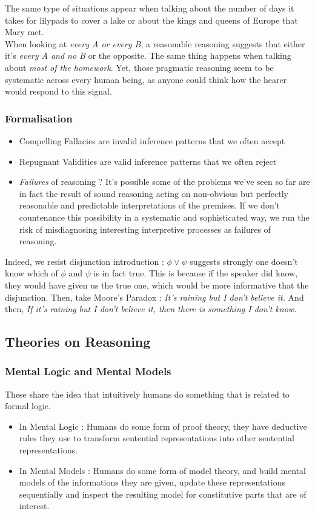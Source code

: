 \documentclass{cours}
\begin{document}
The same type of situations appear when talking about the number of days it takes for lilypads to cover a lake or about the kings and queens of Europe that Mary met.\\
When looking at \textsl{every A or every B}, a reasonable reasoning suggests that either it's \textsl{every A and no B} or the opposite. The same thing happens when talking about \textsl{most of the homework}. Yet, those pragmatic reasoning seem to be systematic across every human being, as anyone could think how the hearer would respond to this signal.

\subsubsection{Formalisation}
\begin{itemize}
    \item Compelling Fallacies are invalid inference patterns that we often accept
    \item Repugnant Validities are valid inference patterns that we often reject
    \item \emph{Failures} of reasoning ? It's possible some of the problems we've seen so far are in fact the result of sound reasoning acting on non-obvious but perfectly reasonable and predictable interpretations of the premises. If we don't countenance this possibility in a systematic and sophisticated way, we run the risk of misdiagnosing interesting interpretive processes as failures of reasoning.
\end{itemize}
Indeed, we resist disjunction introduction : $\phi \lor \psi$ suggests strongly one doesn't know which of $\phi$ and $\psi$ is in fact true. This is because if the speaker did know, they would have given us the true one, which would be more informative that the disjunction. Then, take Moore's Paradox :
\textsl{It's raining but I don't believe it.} And then, \textsl{If it's raining but I don't believe it, then there is something I don't know.}\\

\subsection{Theories on Reasoning}
\subsubsection{Mental Logic and Mental Models}
These share the idea that intuitively humans do something that is related to formal logic.
\begin{itemize}
    \item In Mental Logic : Humans do some form of proof theory, they have deductive rules they use to transform sentential representations into other sentential representations.
    \item In Mental Models : Humans do some form of model theory, and build mental models of the informations they are given, update these representations sequentially and inspect the resulting model for constitutive parts that are of interest.
\end{itemize}
\end{document}
